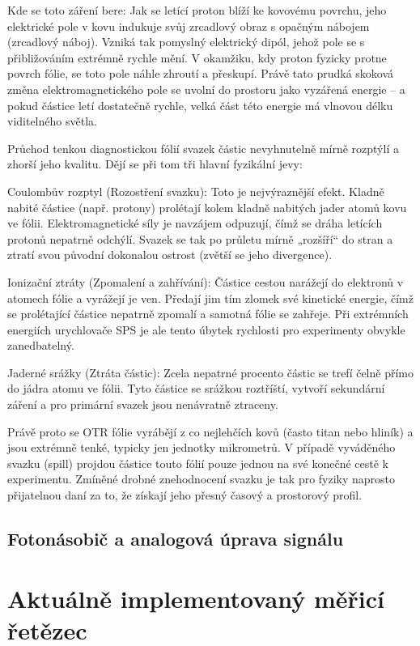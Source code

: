 Kde se toto záření bere:
Jak se letící proton blíží ke kovovému povrchu, jeho elektrické pole v kovu indukuje svůj zrcadlový obraz s opačným nábojem (zrcadlový náboj). Vzniká tak pomyslný elektrický dipól, jehož pole se s přibližováním extrémně rychle mění. V okamžiku, kdy proton fyzicky protne povrch fólie, se toto pole náhle zhroutí a přeskupí. Právě tato prudká skoková změna elektromagnetického pole se uvolní do prostoru jako vyzářená energie – a pokud částice letí dostatečně rychle, velká část této energie má vlnovou délku viditelného světla.

Průchod tenkou diagnostickou fólií svazek částic nevyhnutelně mírně rozptýlí a zhorší jeho kvalitu. Dějí se při tom tři hlavní fyzikální jevy:

Coulombův rozptyl (Rozostření svazku): Toto je nejvýraznější efekt. Kladně nabité částice (např. protony) prolétají kolem kladně nabitých jader atomů kovu ve fólii. Elektromagnetické síly je navzájem odpuzují, čímž se dráha letících protonů nepatrně odchýlí. Svazek se tak po průletu mírně „rozšíří“ do stran a ztratí svou původní dokonalou ostrost (zvětší se jeho divergence).

Ionizační ztráty (Zpomalení a zahřívání): Částice cestou narážejí do elektronů v atomech fólie a vyrážejí je ven. Předají jim tím zlomek své kinetické energie, čímž se prolétající částice nepatrně zpomalí a samotná fólie se zahřeje. Při extrémních energiích urychlovače SPS je ale tento úbytek rychlosti pro experimenty obvykle zanedbatelný.

Jaderné srážky (Ztráta částic): Zcela nepatrné procento částic se trefí čelně přímo do jádra atomu ve fólii. Tyto částice se srážkou roztříští, vytvoří sekundární záření a pro primární svazek jsou nenávratně ztraceny.

Právě proto se OTR fólie vyrábějí z co nejlehčích kovů (často titan nebo hliník) a jsou extrémně tenké, typicky jen jednotky mikrometrů. V případě vyváděného svazku (spill) projdou částice touto fólií pouze jednou na své konečné cestě k experimentu. Zmíněné drobné znehodnocení svazku je tak pro fyziky naprosto přijatelnou daní za to, že získají jeho přesný časový a prostorový profil.



\subsection{Fotonásobič a analogová úprava signálu}

\section{Aktuálně implementovaný měřicí řetězec}

